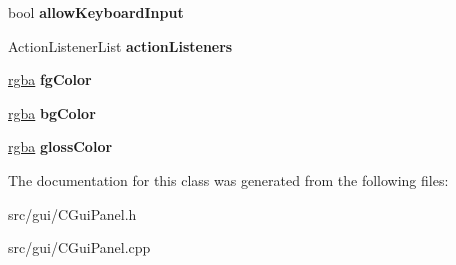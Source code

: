 \begin{DoxyCompactItemize}
\item 
\hypertarget{class_c_gui_panel_a4e7f4575f1f5cae4cc65324cf631dd59}{
bool {\bfseries allowKeyboardInput}}
\label{class_c_gui_panel_a4e7f4575f1f5cae4cc65324cf631dd59}

\item 
\hypertarget{class_c_gui_panel_ae24b80f01f8e3bb528451bcfaec3b5d9}{
ActionListenerList {\bfseries actionListeners}}
\label{class_c_gui_panel_ae24b80f01f8e3bb528451bcfaec3b5d9}

\item 
\hypertarget{class_c_gui_panel_ada9c6281328b6ec9c9c159a8a10e7074}{
\hyperlink{classrgba}{rgba} {\bfseries fgColor}}
\label{class_c_gui_panel_ada9c6281328b6ec9c9c159a8a10e7074}

\item 
\hypertarget{class_c_gui_panel_a849254d825a102ad302dd0c0786beebd}{
\hyperlink{classrgba}{rgba} {\bfseries bgColor}}
\label{class_c_gui_panel_a849254d825a102ad302dd0c0786beebd}

\item 
\hypertarget{class_c_gui_panel_a1ed2220322a396c7df48613715b125a2}{
\hyperlink{classrgba}{rgba} {\bfseries glossColor}}
\label{class_c_gui_panel_a1ed2220322a396c7df48613715b125a2}

\end{DoxyCompactItemize}


The documentation for this class was generated from the following files:\begin{DoxyCompactItemize}
\item 
src/gui/CGuiPanel.h\item 
src/gui/CGuiPanel.cpp\end{DoxyCompactItemize}
